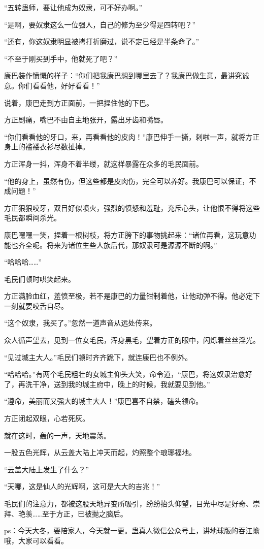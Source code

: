 \begin{this_body}
“五转蛊师，要让他成为奴隶，可不好办啊。”

“是啊，要奴隶这么一位强人，自己的修为至少得是四转吧？”

“还有，你这奴隶明显被拷打折磨过，说不定已经是半条命了。”

“不至于刚买到手中，他就死了吧？”

康巴装作愤慨的样子：“你们把我康巴想到哪里去了？我康巴做生意，最讲究诚意。你们看看他，好好看看！”

说着，康巴走到方正面前，一把捏住他的下巴。

方正剧痛，嘴巴不由自主地张开，露出牙齿和嘴唇。

“你们看看他的牙口，来，再看看他的皮肉！”康巴伸手一撕，刺啦一声，就将方正身上的褴褛衣衫尽数扯掉。

方正浑身一抖，浑身不着半缕，就这样暴露在众多的毛民面前。

“他的身上，虽然有伤，但这些都是皮肉伤，完全可以养好。我康巴可以保证，不成问题！”

方正狠狠咬牙，双目好似喷火，强烈的愤怒和羞耻，充斥心头，让他恨不得将这些毛民都瞬间杀光。

康巴嘿嘿一笑，捏着一根树枝，将方正胯下的事物挑起来：“诸位再看，这玩意功能也齐全呢。将来为诸位生些人族后代，那奴隶可是源源不断的啊。”

“哈哈哈……”

毛民们顿时哄笑起来。

方正满脸血红，羞愤至极，若不是康巴的力量钳制着他，让他动弹不得。他必定下一刻就要咬舌自尽。

“这个奴隶，我买了。”忽然一道声音从远处传来。

众人循声望去，见到一位女毛民，浑身黑毛，望着方正的眼中，闪烁着丝丝淫光。

“见过城主大人。”毛民们顿时齐齐跪下，就连康巴也不例外。

“哈哈哈。”有两个毛民粗壮的女城主仰头大笑，命令道，“康巴，将这奴隶治愈好了，再洗干净，送到我的城主府中，晚上的时候，我就要见到他。”

“遵命，美丽而又强大的城主大人！”康巴喜不自禁，磕头领命。

方正闭起双眼，心若死灰。

就在这时，轰的一声，天地震荡。

一股五色光辉，从云盖大陆上冲天而起，灼照整个琅琊福地。

“云盖大陆上发生了什么？”

“天哪，这是仙人的光辉啊，这可是大大的吉兆！”

毛民们的注意力，都被这股天地异变所吸引，纷纷抬头仰望，目光中尽是好奇、崇拜、艳羡……至于方正，已被抛之脑后。

ps：今天大冬，要陪家人，今天就一更。蛊真人微信公众号上，讲地球版的吞江蟾哦，大家可以看看。

\end{this_body}

